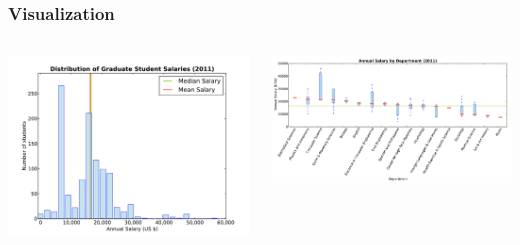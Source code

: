 \begin{frame}
\frametitle{Visualization}

\begin{center}


\begin{columns}

\begin{column}{0.4\textwidth}
\begin{center}
\includegraphics[width=1.0\textwidth]{graphics/salary-distribution1.pdf}
\end{center}
\end{column}

\begin{column}{0.6\textwidth}
\includegraphics[width=1.0\textwidth]{graphics/salary-by-department-median1.pdf}
\end{column}

\end{columns}


\end{center}
\end{frame}
